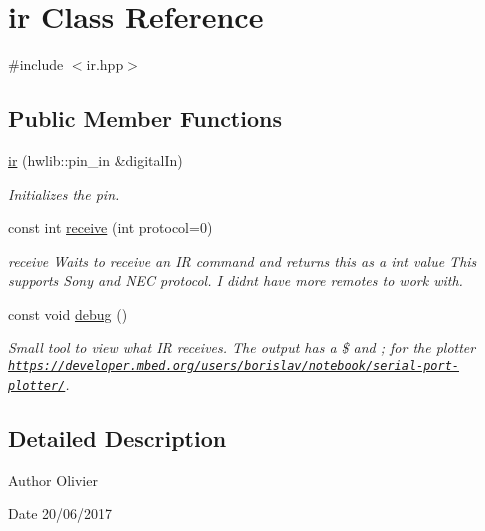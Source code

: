 \hypertarget{classir}{}\section{ir Class Reference}
\label{classir}


{\ttfamily \#include $<$ir.\+hpp$>$}

\subsection*{Public Member Functions}
\begin{DoxyCompactItemize}
\item 
\hyperlink{classir_a991bbdc6f99f2346cde9eb4c502e4eab}{ir} (hwlib\+::pin\+\_\+in \&digital\+In)
\begin{DoxyCompactList}\small\item\em Initializes the pin. \end{DoxyCompactList}\item 
const int \hyperlink{classir_a89c6de406934c73ed5e4a4c122799bc3}{receive} (int protocol=0)
\begin{DoxyCompactList}\small\item\em receive Waits to receive an IR command and returns this as a int value This supports Sony and N\+EC protocol. I didn\textquotesingle{}t have more remotes to work with. \end{DoxyCompactList}\item 
\mbox{\label{classir_a127ebf88b9a98271afdeffb93302cfc1}} 
const void \hyperlink{classir_a127ebf88b9a98271afdeffb93302cfc1}{debug} ()
\begin{DoxyCompactList}\small\item\em Small tool to view what IR receives. The output has a \$ and ; for the plotter \href{https://developer.mbed.org/users/borislav/notebook/serial-port-plotter/}{\tt https\+://developer.\+mbed.\+org/users/borislav/notebook/serial-\/port-\/plotter/}. \end{DoxyCompactList}\end{DoxyCompactItemize}


\subsection{Detailed Description}
\begin{DoxyAuthor}{Author}
Olivier 
\end{DoxyAuthor}
\begin{DoxyDate}{Date}
20/06/2017 
\end{DoxyDate}


